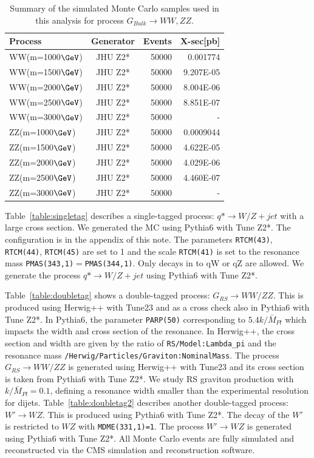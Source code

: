 \begin{table}[htb]
\begin{center}
\begin{tabular}{ |l|c|r|r| }
\hline
Process            & Generator             & Events & X-sec[pb] \\
\hline
WW(m=1000$\GeVcc$) &JHU Z2*   &50000  &0.001774 \\
WW(m=1500$\GeVcc$) &JHU Z2*   &50000  &9.207E-05 \\
WW(m=2000$\GeVcc$) &JHU Z2*   &50000  &8.004E-06 \\
WW(m=2500$\GeVcc$) &JHU Z2*   &50000  &8.851E-07 \\
WW(m=3000$\GeVcc$) &JHU Z2*   &50000  &- \\
ZZ(m=1000$\GeVcc$) &JHU Z2*   &50000  &0.0009044 \\
ZZ(m=1500$\GeVcc$) &JHU Z2*   &50000  &4.622E-05 \\
ZZ(m=2000$\GeVcc$) &JHU Z2*   &50000  &4.029E-06 \\
ZZ(m=2500$\GeVcc$) &JHU Z2*   &50000  &4.460E-07 \\
ZZ(m=3000$\GeVcc$) &JHU Z2*   &50000  &- \\
\hline
\end{tabular}
\end{center}
\caption{Summary of the simulated Monte Carlo samples used in this analysis for process
 $G_{Bulk} \to WW, ZZ$.}
\label{table:doubletagbulk}
\end{table}

Table~\ref{table:singletag} describes a single-tagged process: $q* \to W/Z + jet$
with a large cross section. We generated the MC using Pythia6 with Tune Z2*.
The configuration is in the appendix of this note.
The parameters \verb+RTCM(43)+, \verb+RTCM(44)+, \verb+RTCM(45)+ are set to 1 and the scale \verb+RTCM(41)+ is set to the resonance mass \verb+PMAS(343,1)+$=$\verb+PMAS(344,1)+. 
Only decays in to qW or qZ are allowed.
We generate the process $q* \to W/Z + jet$ using Pythia6 with Tune Z2*.

Table~\ref{table:doubletag} shows a double-tagged process: $G_{RS} \to WW/ZZ$.
This is produced using Herwig++ with Tune23 and as a cross check also in Pythia6 with Tune Z2*. 
In Pythia6, the parameter \verb+PARP(50)+ corresponding to $5.4 k/\bar{M}_{Pl}$ which impacts the width and 
cross section of the resonance.
In Herwig++, the cross section and width are given by the ratio of \verb+RS/Model:Lambda_pi+ and the resonance mass  \verb+/Herwig/Particles/Graviton:NominalMass+.
The process $G_{RS} \to WW/ZZ$ is generated using Herwig++ with Tune23 and its cross section is taken from Pythia6 with Tune Z2*.
We study RS graviton production with $k/\bar{M}_{Pl}=0.1$, defining a resonance width smaller than the experimental resolution for dijets.
Table~\ref{table:doubletag2} describes another double-tagged process:
$W' \to WZ$. This is produced using Pythia6 with Tune Z2*.
The decay of the $W'$ is restricted to $WZ$ with \verb+MDME(331,1)=1+.
The process $W' \to WZ$ is generated using Pythia6 with Tune Z2*.
All Monte Carlo events are fully simulated
and reconstructed via the CMS
simulation and reconstruction software. 

